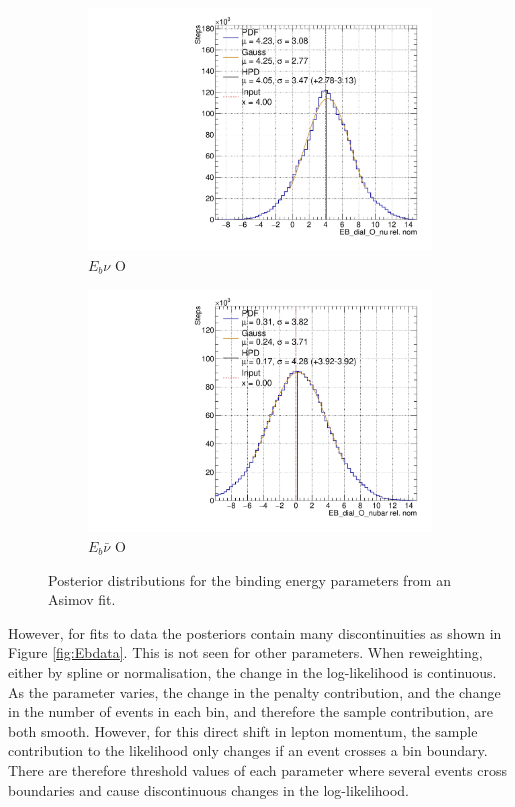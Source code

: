 \begin{figure}
\begin{subfigure}{.48\textwidth}
  \centering
  \includegraphics[width=0.73\linewidth]{figs/EB_dial_O_nuAsmv}
  \caption{$E_{b}\nu$ O}
\end{subfigure}
\begin{subfigure}{.48\textwidth}
  \centering
  \includegraphics[width=0.73\linewidth]{figs/EB_dial_O_nubarAsmv}
  \caption{$E_{b}\bar{\nu}$ O}
\end{subfigure}
\caption{Posterior distributions for the binding energy parameters from an Asimov fit.}
\label{fig:Ebasimov}
\end{figure}

However, for fits to data the posteriors contain many discontinuities as shown in Figure \ref{fig:Ebdata}. This is not seen for other parameters. When reweighting, either by spline or normalisation, the change in the log-likelihood is continuous. As the parameter varies, the change in the penalty contribution, and the change in the number of events in each bin, and therefore the sample contribution, are both smooth. However, for this direct shift in lepton momentum, the sample contribution to the likelihood only changes if an event crosses a bin boundary. There are therefore threshold values of each parameter where several events cross boundaries and cause discontinuous changes in the log-likelihood.

